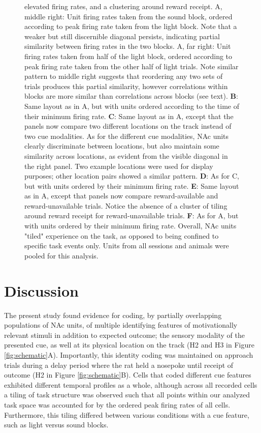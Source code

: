 \documentclass[11pt]{article}
\newcommand{\bsf}[1]{\textbf{#1}}
\begin{document}
{\begin{figure}[h]
{  elevated firing rates, and a clustering around reward receipt. A, middle
  right: Unit firing rates taken from the sound block, ordered according to peak
  firing rate taken from the light block. Note that a weaker but still
  discernible diagonal persists, indicating partial similarity between firing
  rates in the two blocks. A, far right: Unit firing rates taken from half of
  the light block, ordered according to peak firing rate taken from the other
  half of light trials. Note similar pattern to middle right suggests that
  reordering any two sets of trials produces this partial similarity, however
  correlations within blocks are more similar than correlations across blocks
  (see text). \bsf{B}: Same layout as in A, but with units ordered according to
  the time of their minimum firing rate. \bsf{C}: Same layout as in A, except
  that the panels now compare two different locations on the track instead of
  two cue modalities. As for the different cue modalities, NAc units clearly
  discriminate between locations, but also maintain some similarity across
  locations, as evident from the visible diagonal in the right panel. Two
  example locations were used for display purposes; other location pairs showed
  a similar pattern. \bsf{D}: As for C, but with units ordered by their minimum
  firing rate. \bsf{E}: Same layout as in A, except that panels now compare
  reward-available and reward-unavailable trials. Notice the absence of a
  cluster of tiling around reward receipt for reward-unavailable
  trials. \bsf{F}: As for A, but with units ordered by their minimum firing
  rate. Overall, NAc units "tiled" experience on the task, as opposed to being
  confined to specific task events only. Units from all sessions and animals
  were pooled for this analysis.}
\label{fig:NP_tiling}
\end{figure}

\section*{Discussion}

The present study found evidence for coding, by partially overlapping populations of NAc units, of multiple identifying features of motivationally relevant stimuli in addition to expected outcome; the sensory modality of the presented cue, as well at its physical location on the track (H2 and H3 in Figure \ref{fig:schematic}A). Importantly, this identity coding was maintained on approach trials during a delay period where the rat held a nosepoke until receipt of outcome (H2 in Figure \ref{fig:schematic}B). Cells that coded different cue features exhibited different temporal profiles as a whole, although across all recorded cells a tiling of task structure was observed such that all points within our analyzed task space was accounted for by the ordered peak firing rates of all cells. Furthermore, this tiling differed between various conditions with a cue feature, such as light versus sound blocks. 

}
\end{document}
